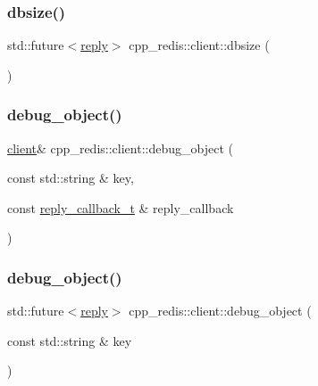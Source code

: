 \mbox{\label{classcpp__redis_1_1client_aa9169c3c4a8b3ec5ee7b7bc601ae8a52}} 
\subsubsection{\texorpdfstring{dbsize()}{dbsize()}\hspace{0.1cm}{\footnotesize\ttfamily [2/2]}}
{\footnotesize\ttfamily std\+::future$<$\hyperlink{classcpp__redis_1_1reply}{reply}$>$ cpp\+\_\+redis\+::client\+::dbsize (\begin{DoxyParamCaption}{ }\end{DoxyParamCaption})}

\mbox{\label{classcpp__redis_1_1client_ad96e4d369e87e858fd7a8296b5cc378e}} 
\subsubsection{\texorpdfstring{debug\+\_\+object()}{debug\_object()}\hspace{0.1cm}{\footnotesize\ttfamily [1/2]}}
{\footnotesize\ttfamily \hyperlink{classcpp__redis_1_1client}{client}\& cpp\+\_\+redis\+::client\+::debug\+\_\+object (\begin{DoxyParamCaption}\item[{const std\+::string \&}]{key,  }\item[{const \hyperlink{classcpp__redis_1_1client_a061a1140d36d2eaeda82b09a0bb3f9f2}{reply\+\_\+callback\+\_\+t} \&}]{reply\+\_\+callback }\end{DoxyParamCaption})}

\mbox{\label{classcpp__redis_1_1client_a9d7a2eae091f99db6b5479577de0bf99}} 
\subsubsection{\texorpdfstring{debug\+\_\+object()}{debug\_object()}\hspace{0.1cm}{\footnotesize\ttfamily [2/2]}}
{\footnotesize\ttfamily std\+::future$<$\hyperlink{classcpp__redis_1_1reply}{reply}$>$ cpp\+\_\+redis\+::client\+::debug\+\_\+object (\begin{DoxyParamCaption}\item[{const std\+::string \&}]{key }\end{DoxyParamCaption})}

